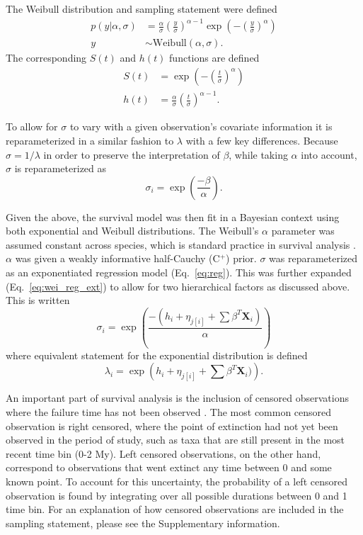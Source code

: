 The Weibull distribution and sampling statement were defined
\begin{align}
  p(y | \alpha, \sigma) &= \frac{\alpha}{\sigma} \left(\frac{y}{\sigma}\right)^{\alpha - 1} \exp\left(-\left(\frac{y}{\sigma}\right)^{\alpha}\right) \nonumber \\
  y &\sim \mathrm{Weibull}(\alpha, \sigma).
  \label{eq:weibull}
\end{align}
The corresponding \(S(t)\) and \(h(t)\) functions are defined
\begin{align}
  S(t) &= \exp\left(-\left(\frac{t}{\sigma}\right)^{\alpha}\right) \label{eq:wei_surv} \\
  h(t) &= \frac{\alpha}{\sigma}\left(\frac{t}{\sigma}\right)^{\alpha - 1} \label{eq:wei_haz}.
\end{align}

To allow for \(\sigma\) to vary with a given observation's covariate information it is reparameterized in a similar fashion to \(\lambda\) with a few key differences. Because \(\sigma = 1/\lambda\) in order to preserve the interpretation of \(\beta\), while taking \(\alpha\) into account, \(\sigma\) is reparameterized as
\begin{equation}
  \sigma_{i} = \exp\left(\frac{-\beta}{\alpha}\right).
  \label{eq:reg}
\end{equation}

Given the above, the survival model was then fit in a Bayesian context using both exponential and Weibull distributions. The Weibull's \(\alpha\) parameter was assumed constant across species, which is standard practice in survival analysis \cite{Klein2003}. \(\alpha\) was given a weakly informative half-Cauchy (C\(^{+}\)) prior. \(\sigma\) was reparameterized as an exponentiated regression model (Eq.~\ref{eq:reg}). This was further expanded (Eq.~\ref{eq:wei_reg_ext}) to allow for two hierarchical factors as discussed above. This is written
\begin{equation}
  \sigma_{i} = \exp\left(\frac{-(h_{i} + \eta_{j[i]} + \sum \beta^{T} \mathbf{X}_{i})}{\alpha}\right)
  \label{eq:wei_reg_ext}
\end{equation}
where equivalent statement for the exponential distribution is defined
\begin{equation}
  \lambda_{i} = \exp\left(h_{i} + \eta_{j[i]} + \sum \beta^{T} \mathbf{X}_{i})\right).
  \label{eq:exp_reg_ext}
\end{equation}

An important part of survival analysis is the inclusion of censored observations where the failure time has not been observed \cite{Ibrahim2001,Klein2003}. The most common censored observation is right censored, where the point of extinction had not yet been observed in the period of study, such as taxa that are still present in the most recent time bin (0-2 My). Left censored observations, on the other hand, correspond to observations that went extinct any time between 0 and some known point. To account for this uncertainty, the probability of a left censored observation is found by integrating over all possible durations between 0 and 1 time bin. For an explanation of how censored observations are included in the sampling statement, please see the Supplementary information.


